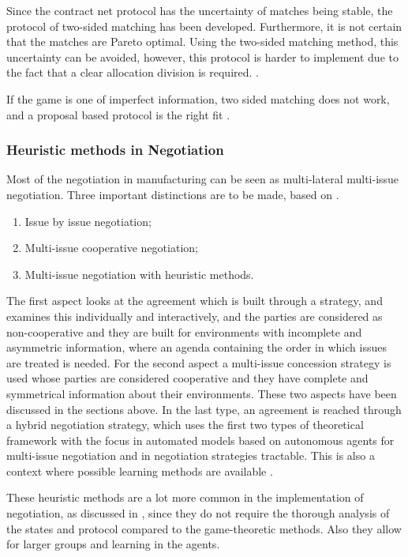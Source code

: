 Since the contract net protocol has the uncertainty of matches being stable, the protocol of two-sided matching has been developed. Furthermore, it is not certain that the matches are Pareto optimal. Using the two-sided matching method, this uncertainty can be avoided, however, this protocol is harder to implement due to the fact that a clear allocation division is required. \citep{fatima2014principles}.
 
If the game is one of imperfect information, two sided matching does not work, and a proposal based protocol is the right fit \citep{rahwan2003argumentation}.


\subsubsection{Heuristic methods in Negotiation}
\label{sec:lit:learn}
Most of the negotiation in manufacturing can be seen as multi-lateral multi-issue negotiation. Three important distinctions are to be made, based on \citet{lai2004literature}. 
\begin{enumerate}
	\item
	Issue by issue negotiation;
	\item
	Multi-issue cooperative negotiation;
	\item
	Multi-issue negotiation with heuristic methods.
	\end{enumerate}
	
The first aspect looks at the agreement which is built through a strategy, and examines this individually and interactively, and the parties are considered as non-cooperative and they are built for environments with incomplete and asymmetric information, where an agenda containing the order in which issues are treated is needed. For the second aspect a multi-issue concession strategy is used whose parties are considered cooperative and they have complete and symmetrical information about their environments. These two aspects have been discussed in the sections above. In the last type, an agreement is reached through a hybrid negotiation strategy, which uses the first two types of theoretical framework with the focus in automated models based on autonomous agents for multi-issue negotiation and in negotiation strategies tractable. This is also a context where possible learning methods are available \citep{schramm2013bilateral}. 
	
These heuristic methods are a lot more common in the implementation of negotiation, as discussed in \citep{leitao2013past, monostori2006agent}, since they do not require the thorough analysis of the states and protocol compared to the game-theoretic methods. Also they allow for larger groups and learning in the agents.
	
